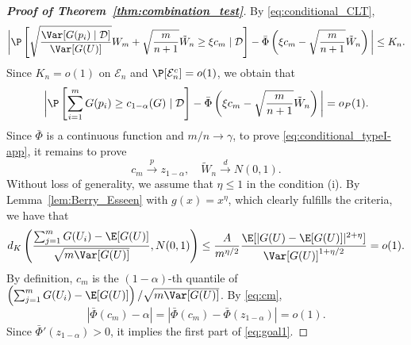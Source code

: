 \begin{proof}[\textbf{Proof of Theorem~\ref{thm:combination_test}}]
By \eqref{eq:conditional_CLT},
\[\bigg|\P\left[\sqrt{\frac{\Var[G(p_i)\mid \mathcal{D}]}{\Var[G(U)]}}W_{m} + \sqrt{\frac{m}{n + 1}}\tilde{W}_{n}\ge \xi c_{m}\mid \mathcal{D}\right] - \bar{\Phi}\left(\xi c_{m} - \sqrt{\frac{m}{n + 1}}\tilde{W}_{n}\right)\bigg| \le K_{n}.\]
Since $K_{n} = o(1)$ on $\mathcal{E}_{n}$ and $\P[\mathcal{E}_{n}^{c}] = o(1)$, we obtain that
\begin{equation}\label{eq:step1}
\bigg|\P\left[\sum_{i=1}^{m}G(p_i)\ge c_{1 - \alpha}(G)\mid \mathcal{D}\right] -  \bar{\Phi}\left(\xi c_{m} - \sqrt{\frac{m}{n + 1}}\tilde{W}_{n}\right)\bigg| = o_{P}(1).
\end{equation}
Since $\bar{\Phi}$ is a continuous function and $m / n\rightarrow \gamma$, to prove \eqref{eq:conditional_typeI-app}, it remains to prove
\begin{equation}\label{eq:goal1}
c_{m}\stackrel{p}{\rightarrow} z_{1 - \alpha}, \quad \tilde{W}_{n}\stackrel{d}{\rightarrow} N(0, 1).
\end{equation}
Without loss of generality, we assume that $\eta \le 1$ in the condition (i). By Lemma~\ref{lem:Berry_Esseen} with $g(x) = x^{\eta}$, which clearly fulfills the criteria, we have that
\begin{equation}\label{eq:cm}
d_{K}\left(\frac{\sum_{j=1}^{m}G(U_i) - \E[G(U)] }{\sqrt{m\Var[G(U)]}}, N(0, 1)\right)\le \frac{A}{m^{\eta / 2}}\frac{\E[|G(U) - \E[G(U)]|^{2 + \eta}]}{\Var[G(U)]^{1 + \eta/2}} = o(1).
\end{equation}
By definition, $c_{m}$ is the $(1 - \alpha)$-th quantile of $\left(\sum_{j=1}^{m}G(U_i) - \E[G(U)]\right) / \sqrt{m\Var[G(U)]}$. By \eqref{eq:cm},
\[|\bar{\Phi}(c_{m}) - \alpha| = |\bar{\Phi}(c_{m}) - \bar{\Phi}(z_{1 - \alpha})| = o(1).\]
Since $\bar{\Phi}'(z_{1 - \alpha}) > 0$, it implies the first part of \eqref{eq:goal1}.


\end{proof}
